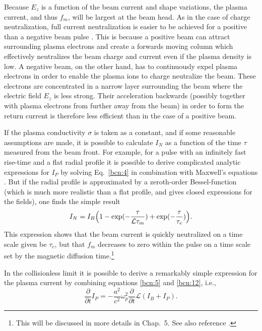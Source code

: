 \documentclass [12pt,a4paper,     ]{report} %
\begin{document}
   Because $E_z$ is a function of the beam current and shape variations, the plasma current, and thus $f_m$, will be largest at the beam head.  As in the case of charge neutralization, full current neutralization is easier to be achieved for a positive than a negative beam pulse \cite{LOTOV1996-,KAGAN2001-}.  This is because a positive beam can attract surrounding plasma electrons and create a forwards moving column which effectively neutralizes the beam charge and current even if the plasma density is low.  A negative beam, on the other hand, has to continuously expel plasma electrons in order to enable the plasma ions to charge neutralize the beam.  These electrons are concentrated in a narrow layer surrounding the beam where the electric field $E_z$ is less strong.  Their acceleration backwards (possibly together with plasma electrons from further away from the beam) in order to form the return current is therefore less efficient than in the case of a positive beam.

   If the plasma conductivity $\sigma$ is taken as a constant, and if some reasonable assumptions are made, it is possible to calculate $I_N$ as a function of the time $\tau$ measured from the beam front.  For example, for a pulse with an infinitely fast rise-time and a flat radial profile it is possible to derive complicated analytic expressions for $I_P$ by solving Eq.~\eqref{bcn:4} in combination with Maxwell's equations \cite{COX--1970-, HAMME1970-}.  But if the radial profile is approximated by a zeroth-order Bessel-function (which is much more realistic than a flat profile, and gives closed expressions for the fields), one finds the simple result \cite[p.147]{MILLE1982-}
\begin{equation}\label{bcn:18} %
     I_N = I_B \Bigl(1 - \exp(-\frac{\tau}{\mathcal{L}\tau_m})
                       + \exp(-\frac{\tau}{           \tau_e}) \Bigr).
\end{equation}
%
This expression shows that the beam current is quickly neutralized on a time scale given be $\tau_e$, but that $f_m$ decreases to zero within the pulse on a time scale set by the magnetic diffusion time.\footnote{This will be discussed in more details in Chap.~5. See also reference \cite{CARY-1980-}.}

  In the collisionless limit it is possible to derive a remarkably simple expression for the plasma current by combining equations \eqref{bcn:5} and \eqref{bcn:12}, i.e.,
%
\begin{equation}\label{bcn:19} %
    \frac{\partial}{\partial t} I_P
       = -\frac{a^2}{c^2} \omega_p^2
          \frac{\partial}{\partial t} \mathcal{L}(I_B + I_P).
\end{equation}
%
\end{document}
